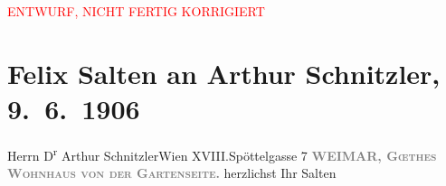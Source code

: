 
\begin{center}
            \textcolor{red}{ENTWURF, NICHT FERTIG KORRIGIERT}
                      \end{center}
            
         \renewcommand{\erwaehnteOrte}{Orte: Edmund-Weiß-Gasse, Goethes Wohnhaus, Weimar, Wien, XVIII., Währing}
         \renewcommand{\erwaehnteWerke}{}
               \section[Felix Salten an Arthur Schnitzler, 9. 6. 1906]{ Felix Salten an Arthur Schnitzler, 9. 6. 1906}\nopagebreak{}\rehead{ }\begin{ledgroupsized}[t]{13cm}\normalsize\beginnumbering \toendnotes[C]{\smallbreak\pagebreak[2]} 
\pstart{}{\pb}Herrn D\textsuperscript{r} Arthur Schnitzler\pend{}\pstart{}Wien XVIII.\pend{}\pstart{}Spöttelgasse 7\pend{}{\bigskip}\pstart
           \noindent{}\centering{}{\pb}\textcolor{gray}{\textbf{WEIMAR, \textsc{Gœthes Wohnhaus von der
                     Gartenseite}.}}\pend
           \pstart
           herzlichst\pend
           \pstart Ihr \spacefill\mbox{Salten}\pend{}
         
         \endnumbering{}\end{ledgroupsized}\begin{anhang}\end{anhang}\newcommand{\dateiname}{L03424}\newcommand{\titel}{Felix Salten an Arthur Schnitzler, 9. 6. 1906}\newcommand{\editorInnen}{Martin Anton Müller und Laura Untner}
      
